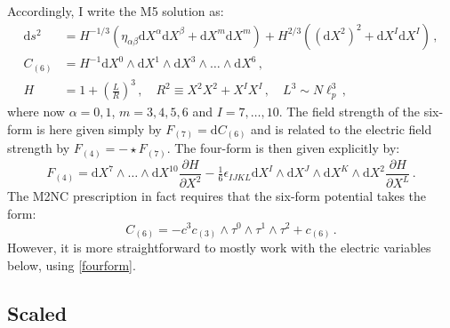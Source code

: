 \documentclass[11pt]{article}
\newcommand{\be}{\begin{equation}}
\newcommand{\ee}{\end{equation}}
\newcommand{\dd}{\mathrm{d}}
\numberwithin{equation}{section}
\begin{document}
{{\noindent Accordingly, I write the M5 solution as:
\be
\label{M5}
\begin{split} 
\dd s^2  & = H^{-1/3} (\eta_{\alpha \beta} \dd X^\alpha \dd X^\beta + \dd X^m \dd X^m ) 
+ H^{2/3} ((\dd X^2)^2  + \dd X^I \dd X^I )  \,,\\[4pt]
C_{(6)} & = H^{-1} \dd X^0 \wedge \dd X^1 \wedge \dd X^3 \wedge \dots \wedge \dd X^6 \,,\\[4pt]
H & = 1 + \left( \frac{L}{R} \right)^3 \,,\quad R^2 \equiv X^2 X^2 + X^I X^I \,,\quad  L^3 \sim N \ell_p^3 \,,
\end{split}
\ee
where now $\alpha=0,1$, $m=3,4,5,6$ and $I=7,\dots,10$.
The field strength of the six-form is here given simply by $F_{(7)} = \dd C_{(6)}$ and is related to the electric field strength by $F_{(4)} = - \star F_{(7)}$. 
The four-form is then given explicitly by:
\be
F_{(4)} = \dd X^7 \wedge \dots \wedge \dd X^{10} \frac{\partial H}{\partial X^2} 
- \tfrac16 \epsilon_{IJKL} \dd X^I \wedge \dd X^J \wedge \dd X^K \wedge \dd X^2\frac{\partial H}{\partial X^L} \,.
\label{fourform}
\ee
The M2NC prescription in fact requires \cite{Blair:2021waq} that the six-form potential takes the form:
\be
C_{(6)} = - c^3 c_{(3)} \wedge \tau^0 \wedge \tau^1 \wedge \tau^2 + c_{(6)} \,.
\label{sixformmnc}
\ee
However, it is more straightforward to mostly work with the electric variables below, using \eqref{fourform}. 

\subsection{Scaled} 
\label{sec:M5scaled}

}}
\end{document}
